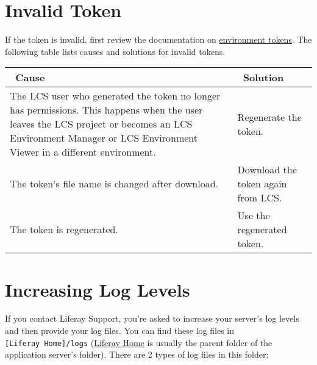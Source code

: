 \noindent\hrulefill

\section{Invalid Token}\label{invalid-token}

If the token is invalid, first review the documentation on
\href{/docs/7-2/deploy/-/knowledge_base/d/understanding-environment-tokens}{environment
tokens}. The following table lists causes and solutions for invalid
tokens.

\noindent\hrulefill

\begin{longtable}[]{@{}
  >{\raggedright\arraybackslash}p{}
  >{\raggedright\arraybackslash}p{}@{}}
\toprule\noalign{}
\begin{minipage}[b]{\linewidth}\raggedright
~Cause
\end{minipage} & \begin{minipage}[b]{\linewidth}\raggedright
~Solution
\end{minipage} \\
\midrule\noalign{}
\endhead
\bottomrule\noalign{}
\endlastfoot
The LCS user who generated the token no longer has permissions. This
happens when the user leaves the LCS project or becomes an LCS
Environment Manager or LCS Environment Viewer in a different
environment. & Regenerate the token. \\
The token's file name is changed after download. & Download the token
again from LCS. \\
The token is regenerated. & Use the regenerated token. \\
\end{longtable}

\noindent\hrulefill

\section{Increasing Log Levels}\label{increasing-log-levels}

If you contact Liferay Support, you're asked to increase your server's
log levels and then provide your log files. You can find these log files
in \texttt{{[}Liferay\ Home{]}/logs}
(\href{/docs/7-2/deploy/-/knowledge_base/d/liferay-home}{Liferay Home}
is usually the parent folder of the application server's folder). There
are 2 types of log files in this folder:

